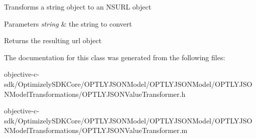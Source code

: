 Transforms a string object to an N\+S\+U\+RL object 
\begin{DoxyParams}{Parameters}
{\em string} & the string to convert \\
\hline
\end{DoxyParams}
\begin{DoxyReturn}{Returns}
the resulting url object 
\end{DoxyReturn}


The documentation for this class was generated from the following files\+:\begin{DoxyCompactItemize}
\item 
objective-\/c-\/sdk/\+Optimizely\+S\+D\+K\+Core/\+O\+P\+T\+L\+Y\+J\+S\+O\+N\+Model/\+O\+P\+T\+L\+Y\+J\+S\+O\+N\+Model/\+O\+P\+T\+L\+Y\+J\+S\+O\+N\+Model\+Transformations/O\+P\+T\+L\+Y\+J\+S\+O\+N\+Value\+Transformer.\+h\item 
objective-\/c-\/sdk/\+Optimizely\+S\+D\+K\+Core/\+O\+P\+T\+L\+Y\+J\+S\+O\+N\+Model/\+O\+P\+T\+L\+Y\+J\+S\+O\+N\+Model/\+O\+P\+T\+L\+Y\+J\+S\+O\+N\+Model\+Transformations/O\+P\+T\+L\+Y\+J\+S\+O\+N\+Value\+Transformer.\+m\end{DoxyCompactItemize}
